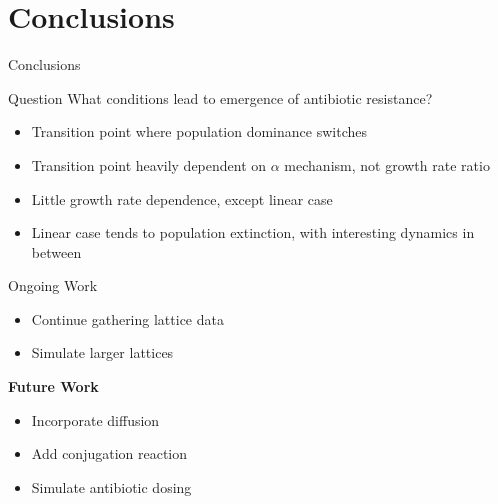 \documentclass[11pt]{beamer}              %
\begin{document}
\section{Conclusions}
\begin{frame}{Conclusions}

    \begin{alertblock}{Question}
      What conditions lead to emergence of antibiotic resistance?
    \end{alertblock}

    \begin{itemize}
      \item Transition point where population dominance switches
      \item Transition point heavily dependent on $\alpha$ mechanism, not growth rate ratio
      \item Little growth rate dependence, except linear case
      \item Linear case tends to population extinction, with interesting dynamics in between
    \end{itemize}
\end{frame}


\begin{frame}{Ongoing Work}

  \begin{itemize}
    \item Continue gathering lattice data
    \item Simulate larger lattices
  \end{itemize}

  \textbf{Future Work}
  \begin{itemize}
    \item Incorporate diffusion
    \item Add conjugation reaction
    \item Simulate antibiotic dosing
  \end{itemize}

\end{frame}
\end{document}
